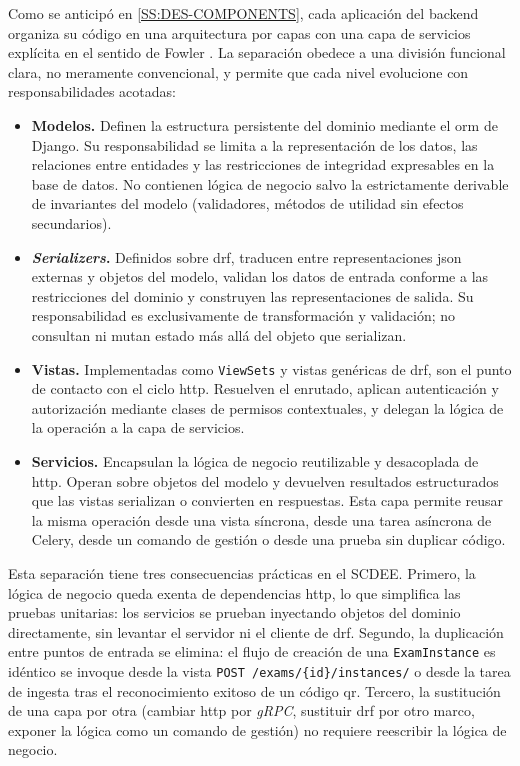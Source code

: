 Como se anticipó en \cref{SS:DES-COMPONENTS}, cada aplicación del backend
organiza su código en una arquitectura por capas con una capa de servicios
explícita en el sentido de Fowler \cite{fowler2002}. La separación obedece
a una división funcional clara, no meramente convencional, y permite que
cada nivel evolucione con responsabilidades acotadas:

\begin{itemize}

  \item \textbf{Modelos.} Definen la estructura persistente del dominio
  mediante el \acs{orm} de Django. Su responsabilidad se limita a la
  representación de los datos, las relaciones entre entidades y las
  restricciones de integridad expresables en la base de datos. No
  contienen lógica de negocio salvo la estrictamente derivable de
  invariantes del modelo (validadores, métodos de utilidad sin efectos
  secundarios).

  \item \textbf{\textit{Serializers}.} Definidos sobre \acs{drf},
  traducen entre representaciones \acs{json} externas y objetos del
  modelo, validan los datos de entrada conforme a las restricciones del
  dominio y construyen las representaciones de salida. Su
  responsabilidad es exclusivamente de transformación y validación; no
  consultan ni mutan estado más allá del objeto que serializan.

  \item \textbf{Vistas.} Implementadas como \texttt{ViewSets} y vistas
  genéricas de \acs{drf}, son el punto de contacto con el ciclo
  \acs{http}. Resuelven el enrutado, aplican autenticación y
  autorización mediante clases de permisos contextuales, y delegan la
  lógica de la operación a la capa de servicios.

  \item \textbf{Servicios.} Encapsulan la lógica de negocio reutilizable
  y desacoplada de \acs{http}. Operan sobre objetos del modelo y
  devuelven resultados estructurados que las vistas serializan o
  convierten en respuestas. Esta capa permite reusar la misma operación
  desde una vista síncrona, desde una tarea asíncrona de Celery, desde
  un comando de gestión o desde una prueba sin duplicar código.

\end{itemize}

Esta separación tiene tres consecuencias prácticas en el SCDEE. Primero,
la lógica de negocio queda exenta de dependencias \acs{http}, lo que
simplifica las pruebas unitarias: los servicios se prueban inyectando
objetos del dominio directamente, sin levantar el servidor ni el cliente
de \acs{drf}. Segundo, la duplicación entre puntos de entrada se elimina:
el flujo de creación de una \texttt{ExamInstance} es idéntico se invoque
desde la vista \texttt{POST /exams/\{id\}/instances/} o desde la tarea de
ingesta tras el reconocimiento exitoso de un código \acs{qr}. Tercero,
la sustitución de una capa por otra (cambiar \acs{http} por \textit{gRPC},
sustituir \acs{drf} por otro marco, exponer la lógica como un comando de
gestión) no requiere reescribir la lógica de negocio.
